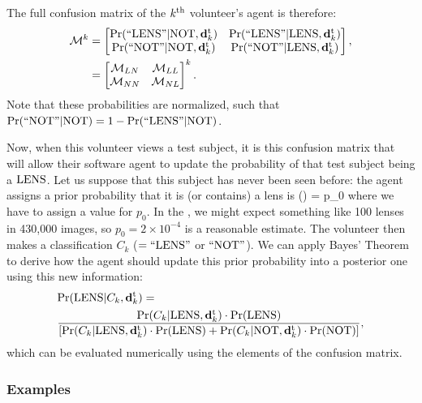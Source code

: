 \documentclass[useAMS,usenatbib,a4paper]{mn2e}
\begin{document}
The full confusion matrix of the $k^{\rm th}$ volunteer's agent is therefore:
\begin{align}
  \mathcal{M}^k &=
  \begin{bmatrix}
    {\rm Pr}({\rm ``LENS"}|{\rm NOT},{\mathbf{d}^{\rm t}_k}) & {\rm Pr}({\rm ``LENS"}|{\rm LENS},{\mathbf{d}^{\rm t}_k}) \\
    {\rm Pr}({\rm ``NOT"} |{\rm NOT},{\mathbf{d}^{\rm t}_k}) & {\rm Pr}({\rm ``NOT"} |{\rm LENS},{\mathbf{d}^{\rm t}_k})
  \end{bmatrix}, \notag \\
        &=
  \begin{bmatrix}
    \mathcal{M}_{LN} & \mathcal{M}_{LL} \\
    \mathcal{M}_{NN} & \mathcal{M}_{NL}
  \end{bmatrix}^k.
  \label{eq:confmat}
\end{align}
Note that these probabilities are normalized, such that
${\rm Pr}({\rm ``NOT"} |{\rm NOT}) = 1 - {\rm Pr}({\rm ``LENS"}|{\rm NOT})$.

Now, when this volunteer views a test subject,
it is this confusion matrix that will allow their software agent to update the
probability of that test subject being a ${\rm LENS}$. Let us suppose that
this subject has never been seen before: the agent assigns a
prior probability that it is (or contains) a lens is
\be
  \pr(\LENS) = p_0
\ee
where we have to assign a value for $p_0$. In the \cfhtls, we might expect
something like 100 lenses in 430,000 images, so $p_0 = 2\times10^{-4}$
is a reasonable estimate. The volunteer then makes a classification $C_k$
($= {\rm ``LENS"}$ or ${\rm ``NOT"}$).
We can apply Bayes' Theorem to derive how the agent should
update this prior probability into a posterior one using this new information:
\begin{align}
  \label{eq:app:first}
  & {\rm Pr}({\rm LENS}|C_k,{\mathbf{d}^{\rm t}_k}) = \\
  & \frac{{\rm Pr}(C_k|{\rm LENS},{\mathbf{d}^{\rm t}_k})\cdot{\rm Pr}({\rm LENS})}
{\left[ {\rm Pr}(C_k|{\rm LENS},{\mathbf{d}^{\rm t}_k})\cdot{\rm Pr}({\rm LENS}) + {\rm Pr}(C_k|{\rm NOT},{\mathbf{d}^{\rm t}_k})\cdot{\rm Pr}({\rm NOT}) \right]},
  \notag
\end{align}
which can be evaluated numerically using the elements of the confusion
matrix.


\subsubsection{Examples}
\label{sec:swap:details:examples}
\end{document}
